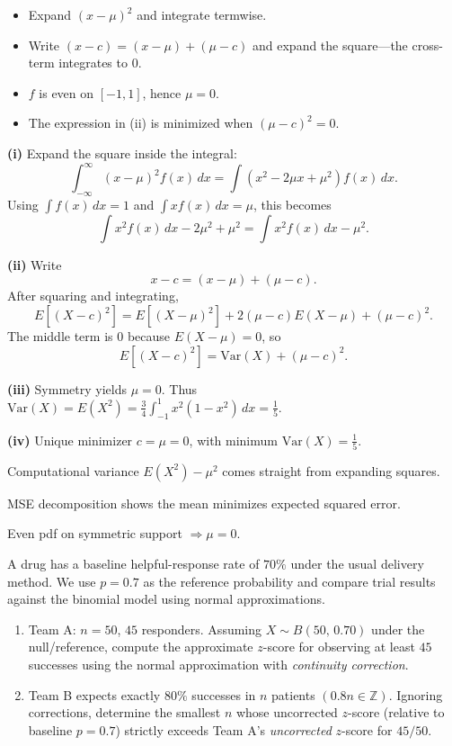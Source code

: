 \begin{hint}
\begin{itemize}[leftmargin=*]
  \item Expand $(x-\mu)^{2}$ and integrate termwise.
  \item Write $(x-c)=(x-\mu)+(\mu-c)$ and expand the square---the cross-term integrates to $0$.
  \item $f$ is even on $[-1,1]$, hence $\mu=0$.
  \item The expression in (ii) is minimized when $(\mu-c)^{2}=0$.
\end{itemize}
\end{hint}

\begin{solution}
\textbf{(i)} Expand the square inside the integral:
\[
\int_{-\infty}^{\infty}(x-\mu)^2f(x)\,dx
=\int (x^2-2\mu x+\mu^2)f(x)\,dx.
\]
Using $\int f(x)\,dx=1$ and $\int xf(x)\,dx=\mu$, this becomes
\[
\int x^2f(x)\,dx-2\mu^2+\mu^2
=\int x^2f(x)\,dx-\mu^2.
\]

\textbf{(ii)} Write
\[
x-c=(x-\mu)+(\mu-c).
\]
After squaring and integrating,
\[
E[(X-c)^2]=E[(X-\mu)^2]+2(\mu-c)E(X-\mu)+(\mu-c)^2.
\]
The middle term is $0$ because $E(X-\mu)=0$, so
\[
E[(X-c)^2]=\mathrm{Var}(X)+(\mu-c)^2.
\]

\textbf{(iii)} Symmetry yields $\mu=0$. Thus $\mathrm{Var}(X)=E(X^{2})=\frac{3}{4}\int_{-1}^{1}x^{2}(1-x^{2})\,dx=\frac{1}{5}$.

\textbf{(iv)} Unique minimizer $c=\mu=0$, with minimum $\mathrm{Var}(X)=\frac{1}{5}$.
\end{solution}

\begin{takeaways}
\item Computational variance $E(X^{2})-\mu^{2}$ comes straight from expanding squares.
\item MSE decomposition shows the mean minimizes expected squared error.
\item Even pdf on symmetric support $\Rightarrow \mu=0$.
\end{takeaways}

\begin{problem}
A drug has a baseline helpful-response rate of $70\%$ under the usual delivery method. We use $p=0{.}7$ as the reference probability and compare trial results against the binomial model using normal approximations.
\begin{enumerate}[label=\textbf{(\roman*)}]
  \item Team A: $n=50$, $45$ responders. Assuming $X\sim B(50,\,0{.}70)$ under the null/reference, compute the approximate $z$-score for observing at least $45$ successes using the normal approximation with \emph{continuity correction}.

  \item Team B expects exactly $80\%$ successes in $n$ patients $(0{.}8n\in\mathbb{Z})$. Ignoring corrections, determine the smallest $n$ whose uncorrected $z$-score (relative to baseline $p=0{.}7$) strictly exceeds Team A's \emph{uncorrected} $z$-score for $45/50$.
\end{enumerate}
\end{problem}

